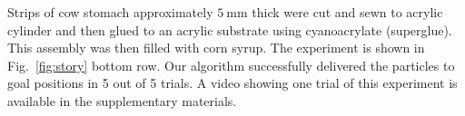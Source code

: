 Strips of cow stomach approximately $\SI{5}{\milli\metre}$ thick were cut and sewn to acrylic cylinder and then glued to an acrylic substrate using cyanoacrylate (superglue). This assembly was then filled with corn syrup. The experiment is shown in Fig.~\ref{fig:story} bottom row. Our algorithm successfully delivered the particles to goal positions in 5 out of 5 trials.
A video showing one trial of this experiment is available in the supplementary materials. 



